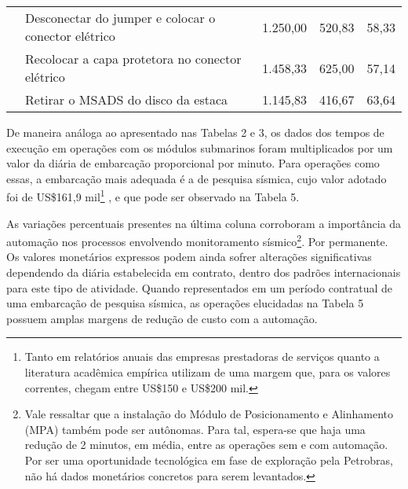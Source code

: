 \begin{table}[h!]
{\begin{tabular}{llccc}
			& Desconectar do jumper e colocar o conector elétrico   & 1.250,00                                                              & 520,83                                                                   & 58,33                                                        \\
			& Recolocar a capa protetora no conector elétrico       & 1.458,33                                                              & 625,00                                                                   & 57,14                                                        \\
			& Retirar o MSADS do disco da estaca                    & 1.145,83                                                              & 416,67                                                                   & 63,64                                                        \\ \hline
		\end{tabular}%
	}
\end{table}
De maneira análoga ao apresentado nas Tabelas 2 e 3, os dados dos tempos de execução em operações com os módulos submarinos foram multiplicados por um valor da diária de embarcação proporcional por minuto. Para operações como essas, a embarcação mais adequada é a de pesquisa sísmica, cujo valor adotado foi de US\$161,9 mil\footnote{Tanto em relatórios anuais das empresas prestadoras de serviços quanto a literatura acadêmica empírica utilizam de uma margem que, para os valores correntes, chegam entre US\$150 e US\$200 mil.} , e que pode ser observado na Tabela 5. 

As variações percentuais presentes na última coluna corroboram a importância da automação nos processos envolvendo monitoramento sísmico\footnote{Vale ressaltar que a instalação do Módulo de Posicionamento e Alinhamento (MPA) também pode ser autônomas. Para tal, espera-se que haja uma redução de 2 minutos, em média, entre as operações sem e com automação. Por ser uma oportunidade tecnológica em fase de exploração pela Petrobras, não há dados monetários concretos para serem levantados.}. Por   permanente. Os valores monetários expressos podem ainda sofrer alterações significativas dependendo da diária estabelecida em contrato, dentro dos padrões internacionais para este tipo de atividade. Quando representados em um período contratual de uma embarcação de pesquisa sísmica, as operações elucidadas na Tabela 5 possuem amplas margens de redução de custo com a automação.

